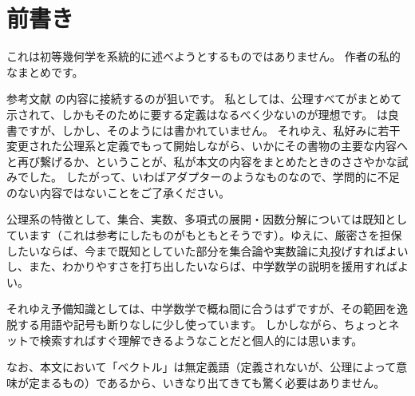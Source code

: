 \chapter*{前書き}

これは初等幾何学を系統的に述べようとするものではありません。
作者の私的なまとめです。

参考文献 \cite{seki} の内容に接続するのが狙いです。
私としては、公理すべてがまとめて示されて、しかもそのために要する定義はなるべく少ないのが理想です。
\cite{seki} は良書ですが、しかし、そのようには書かれていません。
それゆえ、私好みに若干変更された公理系と定義でもって開始しながら、いかにその書物の主要な内容へと再び繋げるか、ということが、私が本文の内容をまとめたときのささやかな試みでした。
したがって、いわばアダプターのようなものなので、学問的に不足のない内容ではないことをご了承ください。

公理系の特徴として、集合、実数、多項式の展開・因数分解については既知としています（これは参考にしたものがもともとそうです）。ゆえに、厳密さを担保したいならば、今まで既知としていた部分を集合論や実数論に丸投げすればよいし、また、わかりやすさを打ち出したいならば、中学数学の説明を援用すればよい。

それゆえ予備知識としては、中学数学で概ね間に合うはずですが、その範囲を逸脱する用語や記号も断りなしに少し使っています。
しかしながら、ちょっとネットで検索すればすぐ理解できるようなことだと個人的には思います。

なお、本文において「ベクトル」は無定義語（定義されないが、公理によって意味が定まるもの）であるから、いきなり出てきても驚く必要はありません。
